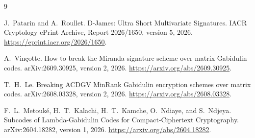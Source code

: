 \documentclass[10pt,a4paper]{article}
\begin{document}
\begin{thebibliography}{9}

J.~Patarin and A.~Roullet.
\newblock D-James: Ultra Short Multivariate Signatures.
\newblock IACR Cryptology ePrint Archive, Report 2026/1650, version 5, 2026.
\newblock \url{https://eprint.iacr.org/2026/1650}.

A.~Vin\c{c}otte.
\newblock How to break the Miranda signature scheme over matrix Gabidulin
codes.
\newblock arXiv:2609.30925, version 2, 2026.
\newblock \url{https://arxiv.org/abs/2609.30925}.

T.~H.~Le.
\newblock Breaking ACDGV MinRank Gabidulin encryption schemes over matrix
codes.
\newblock arXiv:2608.03328, version 2, 2026.
\newblock \url{https://arxiv.org/abs/2608.03328}.

F.~L.~Metouk\'e, H.~T.~Kalachi, H.~T.~Kamche, O.~Ndiaye, and S.~Ndjeya.
\newblock Subcodes of Lambda-Gabidulin Codes for Compact-Ciphertext
Cryptography.
\newblock arXiv:2604.18282, version 1, 2026.
\newblock \url{https://arxiv.org/abs/2604.18282}.

\end{thebibliography}
\end{document}
